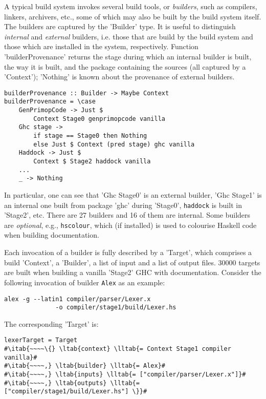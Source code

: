 A typical build system invokes several build tools, or \emph{builders}, such as
compilers, linkers, archivers, etc., some of which may also be built by the
build system itself. The builders are captured by the \lst'Builder' type. It
is useful to distinguish \emph{internal} and \emph{external} builders, i.e.
those that are build by the build system and those which are installed in the
system, respectively. Function \lst'builderProvenance' returns the stage
during which an internal builder is built, the way it is built, and the package
containing the sources (all captured by a \lst'Context'); \lst'Nothing' is
known about the provenance of external builders.

\begin{lstlisting}
builderProvenance :: Builder -> Maybe Context
builderProvenance = \case
    GenPrimopCode -> Just $
        Context Stage0 genprimopcode vanilla
    Ghc stage ->
        if stage == Stage0 then Nothing
        else Just $ Context (pred stage) ghc vanilla
    Haddock -> Just $
        Context $ Stage2 haddock vanilla
    ...
    _ -> Nothing
\end{lstlisting}

In particular, one can see that \lst'Ghc Stage0' is an external builder,
\lst'Ghc Stage1' is an internal one built from package \lst'ghc'
during \lst'Stage0', \texttt{haddock} is built in \lst'Stage2', etc. There are
27 builders and 16 of them are internal. Some builders are \emph{optional}, e.g.,
\texttt{hscolour}, which (if installed) is used to colourise Haskell code when
building documentation.

Each invocation of a builder is fully described by a \lst'Target', which
comprises a build \lst'Context', a \lst'Builder', a list of input and
a list of output files. 30000 targets are built when building a vanilla
\lst'Stage2' GHC with documentation. Consider the following invocation of
builder \texttt{Alex} as an example:

\begin{verbatim}
alex -g --latin1 compiler/parser/Lexer.x
              -o compiler/stage1/build/Lexer.hs
\end{verbatim}

\noindent The corresponding \lst'Target' is:

\newcommand{\ltab}[1]{\hspace{.032\textwidth}\rlap{#1}}
\newcommand{\lltab}[1]{\hspace{.059\textwidth}\rlap{#1}}

\begin{lstlisting}
lexerTarget = Target
#\itab{~~~~\{} \ltab{context} \lltab{= Context Stage1 compiler vanilla}#
#\itab{~~~~,} \ltab{builder} \lltab{= Alex}#
#\itab{~~~~,} \ltab{inputs} \lltab{= ["compiler/parser/Lexer.x"]}#
#\itab{~~~~,} \ltab{outputs} \lltab{= ["compiler/stage1/build/Lexer.hs"] \}}#
\end{lstlisting}

